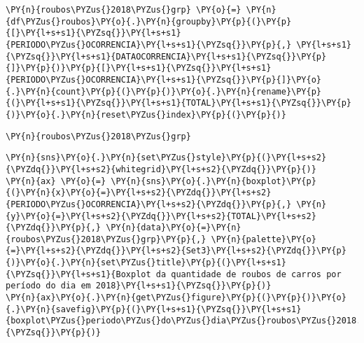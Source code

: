     \begin{tcolorbox}[breakable, size=fbox, boxrule=1pt, pad at break*=1mm,colback=cellbackground, colframe=cellborder]
\begin{Verbatim}[commandchars=\\\{\}]
\PY{n}{roubos\PYZus{}2018\PYZus{}grp} \PY{o}{=} \PY{n}{df\PYZus{}roubos}\PY{o}{.}\PY{n}{groupby}\PY{p}{(}\PY{p}{[}\PY{l+s+s1}{\PYZsq{}}\PY{l+s+s1}{PERIODO\PYZus{}OCORRENCIA}\PY{l+s+s1}{\PYZsq{}}\PY{p}{,} \PY{l+s+s1}{\PYZsq{}}\PY{l+s+s1}{DATAOCORRENCIA}\PY{l+s+s1}{\PYZsq{}}\PY{p}{]}\PY{p}{)}\PY{p}{[}\PY{l+s+s1}{\PYZsq{}}\PY{l+s+s1}{PERIODO\PYZus{}OCORRENCIA}\PY{l+s+s1}{\PYZsq{}}\PY{p}{]}\PY{o}{.}\PY{n}{count}\PY{p}{(}\PY{p}{)}\PY{o}{.}\PY{n}{rename}\PY{p}{(}\PY{l+s+s1}{\PYZsq{}}\PY{l+s+s1}{TOTAL}\PY{l+s+s1}{\PYZsq{}}\PY{p}{)}\PY{o}{.}\PY{n}{reset\PYZus{}index}\PY{p}{(}\PY{p}{)}
\end{Verbatim}
\end{tcolorbox}

    \begin{tcolorbox}[breakable, size=fbox, boxrule=1pt, pad at break*=1mm,colback=cellbackground, colframe=cellborder]
\begin{Verbatim}[commandchars=\\\{\}]
\PY{n}{roubos\PYZus{}2018\PYZus{}grp}
\end{Verbatim}
\end{tcolorbox}

    \begin{tcolorbox}[breakable, size=fbox, boxrule=1pt, pad at break*=1mm,colback=cellbackground, colframe=cellborder]
\begin{Verbatim}[commandchars=\\\{\}]
\PY{n}{sns}\PY{o}{.}\PY{n}{set\PYZus{}style}\PY{p}{(}\PY{l+s+s2}{\PYZdq{}}\PY{l+s+s2}{whitegrid}\PY{l+s+s2}{\PYZdq{}}\PY{p}{)}
\PY{n}{ax} \PY{o}{=} \PY{n}{sns}\PY{o}{.}\PY{n}{boxplot}\PY{p}{(}\PY{n}{x}\PY{o}{=}\PY{l+s+s2}{\PYZdq{}}\PY{l+s+s2}{PERIODO\PYZus{}OCORRENCIA}\PY{l+s+s2}{\PYZdq{}}\PY{p}{,} \PY{n}{y}\PY{o}{=}\PY{l+s+s2}{\PYZdq{}}\PY{l+s+s2}{TOTAL}\PY{l+s+s2}{\PYZdq{}}\PY{p}{,} \PY{n}{data}\PY{o}{=}\PY{n}{roubos\PYZus{}2018\PYZus{}grp}\PY{p}{,} \PY{n}{palette}\PY{o}{=}\PY{l+s+s2}{\PYZdq{}}\PY{l+s+s2}{Set3}\PY{l+s+s2}{\PYZdq{}}\PY{p}{)}\PY{o}{.}\PY{n}{set\PYZus{}title}\PY{p}{(}\PY{l+s+s1}{\PYZsq{}}\PY{l+s+s1}{Boxplot da quantidade de roubos de carros por período do dia em 2018}\PY{l+s+s1}{\PYZsq{}}\PY{p}{)}
\PY{n}{ax}\PY{o}{.}\PY{n}{get\PYZus{}figure}\PY{p}{(}\PY{p}{)}\PY{o}{.}\PY{n}{savefig}\PY{p}{(}\PY{l+s+s1}{\PYZsq{}}\PY{l+s+s1}{boxplot\PYZus{}periodo\PYZus{}do\PYZus{}dia\PYZus{}roubos\PYZus{}2018.png}\PY{l+s+s1}{\PYZsq{}}\PY{p}{)}
\end{Verbatim}
\end{tcolorbox}

